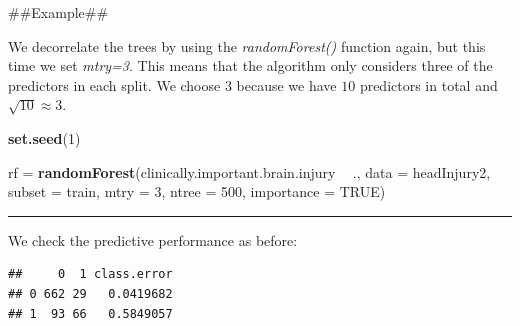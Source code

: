 \documentclass[]{article}
\newenvironment{Shaded}{\begin{snugshade}}{\end{snugshade}}
\newcommand{\DataTypeTok}[1]{\textcolor[rgb]{0.13,0.29,0.53}{#1}}
\newcommand{\DecValTok}[1]{\textcolor[rgb]{0.00,0.00,0.81}{#1}}
\newcommand{\KeywordTok}[1]{\textcolor[rgb]{0.13,0.29,0.53}{\textbf{#1}}}
\newcommand{\NormalTok}[1]{#1}
\newcommand{\OperatorTok}[1]{\textcolor[rgb]{0.81,0.36,0.00}{\textbf{#1}}}
\newcommand{\OtherTok}[1]{\textcolor[rgb]{0.56,0.35,0.01}{#1}}
\newcommand{\StringTok}[1]{\textcolor[rgb]{0.31,0.60,0.02}{#1}}
\begin{document}
\#\#Example\#\#

We decorrelate the trees by using the \emph{randomForest()} function
again, but this time we set \emph{mtry=3}. This means that the algorithm
only considers three of the predictors in each split. We choose \(3\)
because we have \(10\) predictors in total and \(\sqrt{10}\approx 3\).

\begin{Shaded}
\begin{Highlighting}[]
\KeywordTok{set.seed}\NormalTok{(}\DecValTok{1}\NormalTok{)}

\NormalTok{rf =}\StringTok{ }\KeywordTok{randomForest}\NormalTok{(clinically.important.brain.injury }\OperatorTok{~}\StringTok{ }\NormalTok{., }\DataTypeTok{data =}\NormalTok{ headInjury2, }
    \DataTypeTok{subset =}\NormalTok{ train, }\DataTypeTok{mtry =} \DecValTok{3}\NormalTok{, }\DataTypeTok{ntree =} \DecValTok{500}\NormalTok{, }\DataTypeTok{importance =} \OtherTok{TRUE}\NormalTok{)}
\end{Highlighting}
\end{Shaded}

\begin{center}\rule{0.5\linewidth}{\linethickness}\end{center}

We check the predictive performance as before: \footnotesize

\begin{Shaded}
\end{Shaded}

\begin{verbatim}
##     0  1 class.error
## 0 662 29   0.0419682
## 1  93 66   0.5849057
\end{verbatim}

\begin{Shaded}
\end{Shaded}
\end{document}
